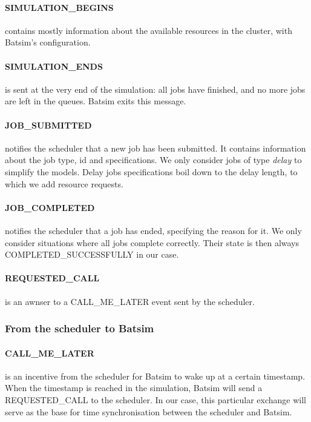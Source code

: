 \paragraph{SIMULATION\_BEGINS}
contains mostly information about the available resources in the cluster, with
Batsim's configuration.

\paragraph{SIMULATION\_ENDS}
is sent at the very end of the simulation: all jobs have finished, and no more
jobs are left in the queues. Batsim exits this message.

\paragraph{JOB\_SUBMITTED}
notifies the scheduler that a new job has been submitted. It contains
information about the job type, id and specifications. We only consider jobs of
type \textit{delay} to simplify the models. Delay jobs specifications boil down
to the delay length, to which we add resource requests.

\paragraph{JOB\_COMPLETED}
notifies the scheduler that a job has ended, specifying the reason for it. We
only consider situations where all jobs complete correctly. Their state is then
always COMPLETED\_SUCCESSFULLY in our case.

\paragraph{REQUESTED\_CALL}
is an awnser to a CALL\_ME\_LATER event sent by the scheduler.

\subsubsection{From the scheduler to Batsim}

\paragraph{CALL\_ME\_LATER}
is an incentive from the scheduler for Batsim to wake up at a certain
timestamp. When the timestamp is reached in the simulation, Batsim will send a
REQUESTED\_CALL to the scheduler. In our case, this particular exchange will
serve as the base for time synchronisation between the scheduler and Batsim.

